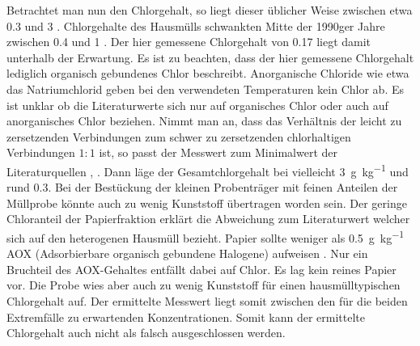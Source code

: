Betrachtet man nun den Chlorgehalt, so liegt dieser üblicher Weise zwischen etwa \SI{0,3}{\mpercent} und \SI{3}{\mpercent}  \cite{LLA_Abfallanalyse}. Chlorgehalte des Hausmülls schwankten Mitte der 1990ger Jahre zwischen \SI{0,4}{\mpercent} und \SI{1}{\mpercent} \cite[S.22, Tab. 2.1]{scholz2013}. Der hier gemessene Chlorgehalt von \SI{0,17}{\mpercent} liegt damit unterhalb der Erwartung. Es ist zu beachten, dass der hier gemessene Chlorgehalt lediglich organisch gebundenes Chlor beschreibt. Anorganische Chloride wie etwa das Natriumchlorid geben bei den verwendeten Temperaturen kein Chlor ab. Es ist unklar ob die Literaturwerte sich nur auf organisches Chlor oder auch auf anorganisches Chlor beziehen. Nimmt man an, dass das Verhältnis der leicht zu zersetzenden Verbindungen zum schwer zu zersetzenden chlorhaltigen Verbindungen $1:1$ ist, so passt der Messwert zum Minimalwert der Literaturquellen \cite{LLA_Abfallanalyse}, \cite{scholz2013}. Dann läge der Gesamtchlorgehalt bei vielleicht \SI{3}{\gram\per\kilogram} und rund \SI{0,3}{\mpercent}. Bei der Bestückung der kleinen Probenträger mit feinen Anteilen der Müllprobe könnte auch zu wenig Kunststoff übertragen worden sein. Der geringe Chloranteil der Papierfraktion erklärt die Abweichung zum Literaturwert welcher sich auf den heterogenen Hausmüll bezieht. Papier sollte weniger als \SI{0,5}{\gram\per\kilogram} AOX (Adsorbierbare organisch gebundene Halogene) aufweisen \cite{lexikon}. Nur ein Bruchteil des AOX-Gehaltes entfällt dabei auf Chlor. Es lag kein reines Papier vor. Die Probe wies aber auch zu wenig Kunststoff für einen hausmülltypischen Chlorgehalt auf. Der ermittelte Messwert liegt somit zwischen den für die beiden Extremfälle zu erwartenden Konzentrationen. Somit kann der ermittelte Chlorgehalt auch nicht als falsch ausgeschlossen werden.


